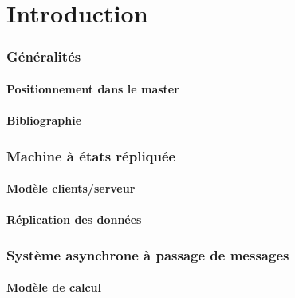 
\begingroup

\part{Introduction}
 
 
\section{Généralités}
 
\subsection{Positionnement dans le master}

 
\subsection{Bibliographie}

 
\section{Machine à états répliquée}
 
\subsection{Modèle clients/serveur}


 
\subsection{Réplication des données}



 
\section{Système asynchrone à passage de messages}
 
\subsection{Modèle de calcul}




  
